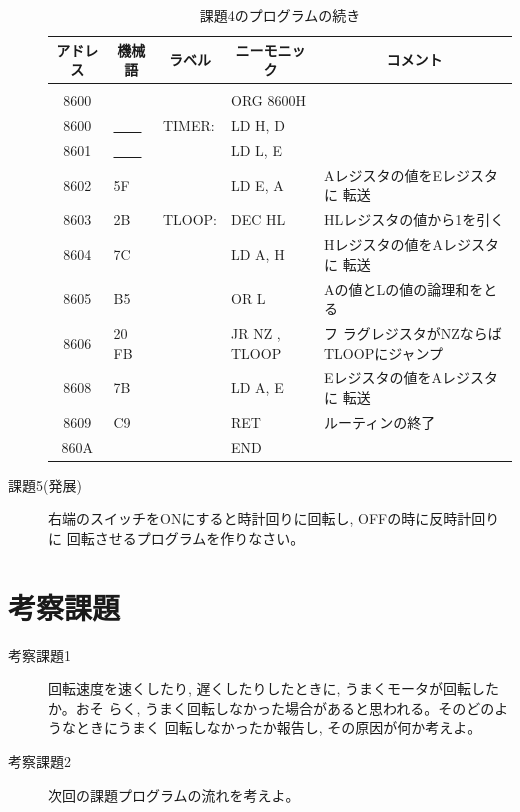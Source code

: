 \begin{description}
\begin{table}
\begin{center}
\caption{課題4のプログラムの続き}
\label{tab:q3-4-2}
\footnotesize
\begin{tabular}{|c|l|ll|l|}
\hline
アドレス& \multicolumn{1}{|c|}{機械語}&\multicolumn{1}{|c}{ラベル}&\multicolumn{1}{c|}{ニーモニック}&\multicolumn{1}{|c|}{コメント}\\
\hline
       &          &  &     &\\
   8600 &          &  &     ORG 8600H&\\
   8600 & \underline{~~~~}       &   TIMER:& LD H, D&\\
   8601 & \underline{~~~~}       &  &     LD L, E&\\
   8602 &  5F        &    &    LD E, A&Aレジスタの値をEレジスタに
                    転送\\
   8603 &  2B        &    TLOOP:& DEC HL&HLレジスタの値から1を引く\\
   8604 &  7C        &    &    LD A, H&Hレジスタの値をAレジスタに
                    転送\\
   8605 &  B5        &    &    OR L& Aの値とLの値の論理和をとる\\
   8606 &  20 FB       &    &    JR NZ , TLOOP& フ
                    ラグレジスタがNZならばTLOOPにジャンプ\\
   8608 &  7B        &    &    LD A, E& Eレジスタの値をAレジスタに
                    転送\\
   8609 &  C9        &    &    RET&ルーティンの終了\\
   860A &            &    &    END&\\


\hline
\end{tabular}
\end{center}
\end{table}

\item[課題5(発展)] 右端のスイッチをONにすると時計回りに回転し, OFFの時に反時計回りに
           回転させるプログラムを作りなさい。


\end{description}


\section{考察課題}
\begin{description}
\item[考察課題1] 回転速度を速くしたり, 遅くしたりしたときに, うまくモータが回転したか。おそ
      らく, うまく回転しなかった場合があると思われる。そのどのようなときにうまく
      回転しなかったか報告し, その原因が何か考えよ。
\item[考察課題2] 次回の課題プログラムの流れを考えよ。

\end{description}
